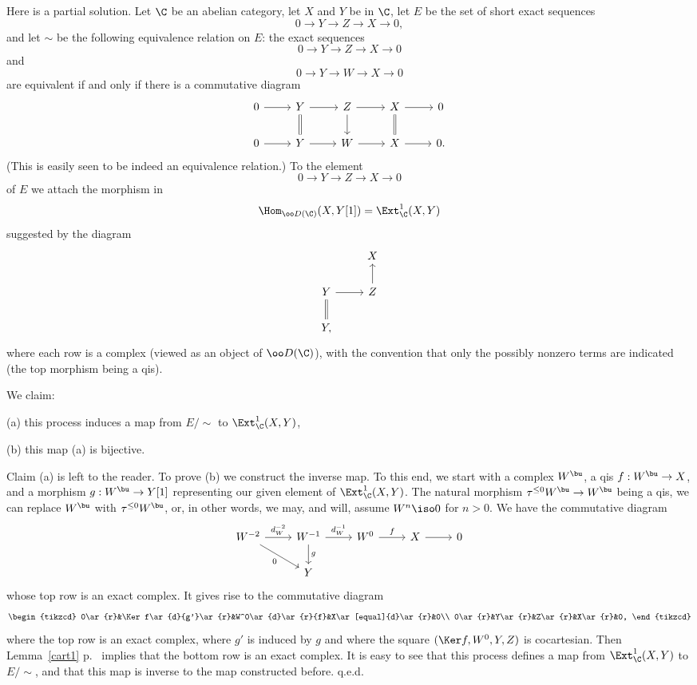 \documentclass[12pt]{article}
\theoremstyle{remark}
\theoremstyle{definition}
\begin{document}
Here is a partial solution. Let $\C$ be an abelian category, let $X$ and $Y$ be in $\C$, let $E$ be the set of short exact sequences 
$$
0\to Y\to Z\to X\to0,
$$ 
and let $\sim$ be the following equivalence relation on $E$: the exact sequences 
$$
0\to Y\to Z\to X\to0
$$ 
and 
$$
0\to Y\to W\to X\to0
$$ 
are equivalent if and only if there is a commutative diagram 
$$
\begin{tikzcd}
0\ar{r}&Y\ar[equal]{d}\ar{r}&Z\ar{d}\ar{r}&X\ar[equal]{d}\ar{r}&0\\ 
0\ar{r}&Y\ar{r}&W\ar{r}&X\ar{r}&0.
\end{tikzcd}
$$ 
(This is easily seen to be indeed an equivalence relation.) To the element 
$$
0\to Y\to Z\to X\to0
$$ 
of $E$ we attach the morphism in 
$$
\Hom_{\oo D(\C)}(X,Y[1])=\Ext^1_\C(X,Y)
$$ 
suggested by the diagram 
$$
\begin{tikzcd}
{}&X\\ 
Y\ar[equal]{d}\ar{r}&Z\ar{u}\\ 
Y,
\end{tikzcd}
$$ 
where each row is a complex (viewed as an object of $\oo D(\C)$), with the convention that only the possibly nonzero terms are indicated (the top morphism being a qis). 

We claim: 

(a) this process induces a map from $E/\!\!\sim$ to $\Ext^1_\C(X,Y)$, 

(b) this map (a) is bijective. 

Claim (a) is left to the reader. To prove (b) we construct the inverse map. To this end, we start with a complex $W^\bu$, a qis $f:W^\bu\to X$, and a morphism $g:W^\bu\to Y[1]$ representing our given element of $\Ext^1_\C(X,Y)$. The natural morphism $\tau^{\le0}W^\bu\to W^\bu$ being a qis, we can replace $W^\bu$ with $\tau^{\le0}W^\bu$, or, in other words, we may, and will, assume $W^n\iso0$ for $n>0$. We have the commutative diagram 
$$
\begin{tikzcd}
W^{-2}\ar[dr,"0"']\ar[r,"d_W^{-2}"]&W^{-1}\ar[d,"g"]\ar[r,"d_W^{-1}"]&W^0\ar[r,"f"]&X\ar[r]&0\\ 
&Y
\end{tikzcd}
$$ 
whose top row is an exact complex. It gives rise to the commutative diagram 
$$
\begin{tikzcd}
0\ar{r}&\Ker f\ar{d}{g'}\ar{r}&W^0\ar{d}\ar{r}{f}&X\ar[equal]{d}\ar{r}&0\\ 
0\ar{r}&Y\ar{r}&Z\ar{r}&X\ar{r}&0,
\end{tikzcd}
$$ 
where the top row is an exact complex, where $g'$ is induced by $g$ and where the square $(\Ker f,W^0,Y,Z)$ is cocartesian. Then Lemma~\ref{cart1} p.~ implies that the bottom row is an exact complex. It is easy to see that this process defines a map from $\Ext^1_\C(X,Y)$ to $E/\!\!\sim$, and that this map is inverse to the map constructed before. q.e.d.
\end{document}
